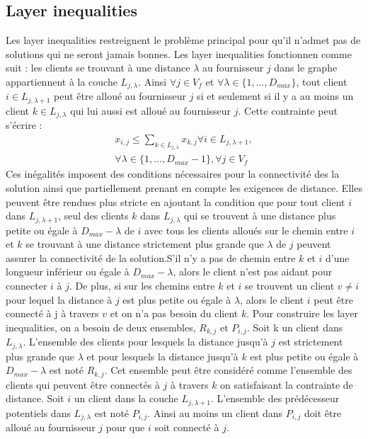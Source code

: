 \documentclass[12pt,a4paper]{article}
\begin{document}
\begin{multicols}{2}
\subsection{Layer inequalities}
Les layer inequalities restreignent le problème principal pour qu'il n'admet pas de solutions qui ne seront jamais bonnes. Les layer inequalities fonctionnen comme suit : les clients se trouvant à une distance $\lambda$ au fournisseur $j$ dans le graphe appartiennent à la couche $L_{j,\lambda}$. Ainsi $\forall j \in V_{f}$ et $\forall \lambda \in \{1,...,D_{max} \}$, tout client $i \in L_{j,\lambda + 1}$ peut être alloué au fournisseur $j$ si et seulement si il y a au moins un client $k \in L_{j,\lambda}$ qui lui aussi est alloué au fournisseur $j$. Cette contrainte peut s'écrire : 
\begin{align*}
x_{i,j} \leq \sum_{k \in L_{j,\lambda} }{x_{k,j}} \forall i \in L_{j,\lambda +1},\\ \forall \lambda \in \{ 1,...,D_{max}-1 \}, \forall j \in V_{f}
\end{align*}
Ces inégalités imposent des conditions nécessaires pour la connectivité des la solution ainsi que partiellement prenant en compte les exigences de distance. Elles peuvent être rendues plus stricte en ajoutant la condition que pour tout client $i$ dans $L_{j,\lambda +1}$, seul des clients $k$ dans $L_{j,\lambda}$ qui se trouvent à une distance plus petite ou égale à $D_{max}-\lambda$ de $i$ avec tous les clients alloués sur le chemin entre $i$ et $k$ se trouvant à une distance strictement plus grande que $\lambda$ de $j$ peuvent assurer la connectivité de la solution.S'il n'y a pas de chemin entre $k$ et $i$ d'une longueur inférieur ou égale à $D_{max}-\lambda$, alors le client n'est pas aidant pour connecter $i$ à $j$. De plus, si sur les chemins entre $k$ et $i$ se trouvent un client $v \neq i$ pour lequel la distance à $j$ est plus petite ou égale à $\lambda$, alors le client $i$ peut être connecté à j à travers $v$ et on n'a pas besoin du client $k$.\newline \indent
Pour construire les layer inequalities, on a besoin de deux ensembles, $R_{k,j}$ et $P_{i,j}$. Soit k un client dans $L_{j,\lambda}$. L'ensemble des clients pour lesquels la distance jusqu'à $j$ est strictement plus grande que $\lambda$ et pour lesquels la distance jusqu'à $k$ est plus petite ou égale à $D_{max}-\lambda$ est noté $R_{k,j}$. Cet ensemble peut être considéré comme l'ensemble des clients qui peuvent être connectés à $j$ à travers $k$ on satisfaisant la contrainte de distance. Soit $i$ un client dans la couche $L_{j,\lambda +1}$. L'ensemble des prédécesseur potentiels dans $L_{j,\lambda}$ est noté $P_{i,j}$. Ainsi au moins un client dans $P_{i,j}$ doit être alloué au fournisseur $j$ pour que $i$ soit connecté à $j$.\newline\indent

\end{multicols}
\end{document}
